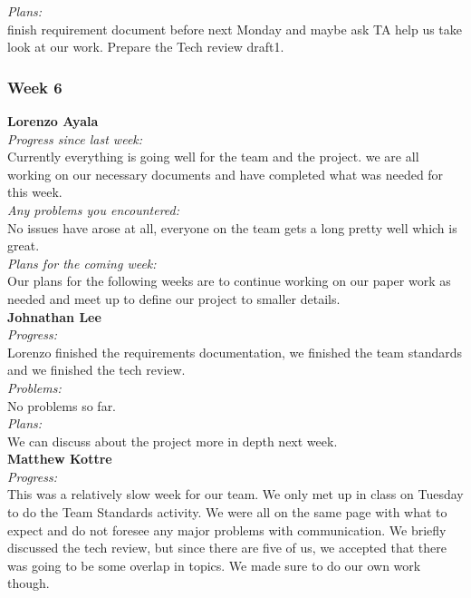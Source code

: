 \noindent\textit{Plans:}\\
\noindent finish requirement document before next Monday and maybe ask TA help us take look at our work. Prepare the Tech review draft1.\\

\subsubsection{Week 6}

\textbf{Lorenzo Ayala}\\
\noindent\textit{Progress since last week:}\\
Currently everything is going well for the team and the project. we are all working on our necessary documents and have completed what was needed for this week. \\

\noindent\textit{Any problems you encountered:}\\
\noindent No issues have arose at all, everyone on the team gets a long pretty well which is great.\\

\noindent\textit{Plans for the coming week:}\\
\noindent Our plans for the following weeks are to continue working on our paper work as needed and meet up to define our project to smaller details.\\

\noindent\textbf{Johnathan Lee}\\
\noindent\textit{Progress:}\\
Lorenzo finished the requirements documentation, we finished the team standards and we finished the tech review. \\

\noindent\textit{Problems:}\\
\noindent No problems so far.\\

\noindent\textit{Plans:}\\
\noindent We can discuss about the project more in depth next week.\\

\noindent\textbf{Matthew Kottre}\\
\noindent\textit{Progress:}\\
This was a relatively slow week for our team. We only met up in class on Tuesday to do the Team Standards activity. We were all on the same page with what to expect and do not foresee any major problems with communication. We briefly discussed the tech review, but since there are five of us, we accepted that there was going to be some overlap in topics. We made sure to do our own work though.\\

